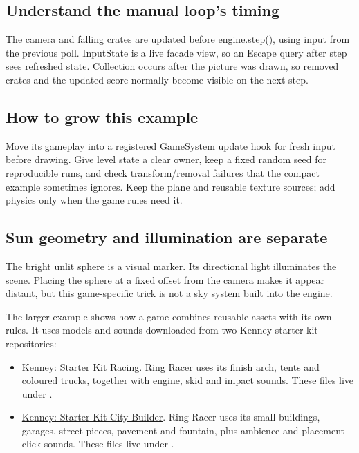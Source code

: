 \documentclass[11pt,a4paper]{article}
\begin{document}
\subsection*{Understand the manual loop's timing}
The camera and falling crates are updated before engine.step(), using input from the previous poll. InputState is a live facade view, so an Escape query after step sees refreshed state. Collection occurs after the picture was drawn, so removed crates and the updated score normally become visible on the next step.

\subsection*{How to grow this example}
Move its gameplay into a registered GameSystem update hook for fresh input before drawing. Give level state a clear owner, keep a fixed random seed for reproducible runs, and check transform/removal failures that the compact example sometimes ignores. Keep the plane and reusable texture sources; add physics only when the game rules need it.

\subsection*{Sun geometry and illumination are separate}
The bright unlit sphere is a visual marker. Its directional light illuminates the scene. Placing the sphere at a fixed offset from the camera makes it appear distant, but this game-specific trick is not a sky system built into the engine.

The larger  example shows how a game combines reusable assets with its own rules. It uses models and sounds downloaded from two Kenney starter-kit repositories:

\begin{itemize}
\item \href{https://github.com/KenneyNL/Starter-Kit-Racing}{Kenney: Starter Kit Racing}. Ring Racer uses its finish arch, tents and coloured trucks, together with engine, skid and impact sounds. These files live under .
\item \href{https://github.com/KenneyNL/Starter-Kit-City-Builder}{Kenney: Starter Kit City Builder}. Ring Racer uses its small buildings, garages, street pieces, pavement and fountain, plus ambience and placement-click sounds. These files live under .
\end{itemize}
\end{document}
